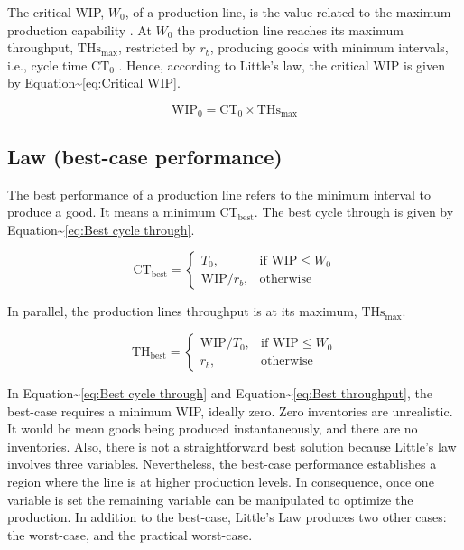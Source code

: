\documentclass{article}
\begin{document}
The critical WIP, \(W_0\), of a production line, is the value related to the maximum production capability \citep[p.219]{Hopp2001}.
At \(W_0\) the production line reaches its maximum throughput, \(\mbox{THs}_{\mbox{max}}\), restricted by \(r_b\), producing goods with minimum intervals, i.e., cycle time \(\mbox{CT}_0\) \citep{Martin1998}.
Hence, according to Little's law, the critical WIP is given by Equation\textasciitilde{}\ref{eq:Critical WIP}.

\begin{equation}\label{eq:Critical WIP}
  \mbox{WIP}_0 = \mbox{CT}_0 \times \mbox{THs}_{\mbox{max}}
\end{equation}

\subsection{Law (best-case performance)}

The best performance of a production line refers to the minimum interval to produce a good.
It means a minimum \(\mbox{CT}_{\mbox{best}}\).
The best cycle through is given by Equation\textasciitilde{}\ref{eq:Best cycle through}.

\begin{equation}\label{eq:Best cycle through}
    \mbox{CT}_{\mbox{best}}=
    \begin{cases}
 T_0,  & \mbox{if }\mbox{WIP} \le W_0\\
  \mbox{WIP}/r_b, & \mbox{otherwise }
    \end{cases}
\end{equation}

In parallel, the production lines throughput is at its maximum, \(\mbox{THs}_{\mbox{max}}\).

\begin{equation}\label{eq:Best throughput}
    \mbox{TH}_{\mbox{best}}=
    \begin{cases}
 \mbox{WIP}/T_0,  & \mbox{if }\mbox{WIP} \le W_0\\
  r_b, & \mbox{otherwise }
    \end{cases}
\end{equation}

In Equation\textasciitilde{}\ref{eq:Best cycle through} and Equation\textasciitilde{}\ref{eq:Best throughput}, the best-case requires a minimum WIP, ideally zero.
Zero inventories are unrealistic.
It would be mean goods being produced instantaneously, and there are no inventories.
Also, there is not a straightforward best solution because Little's law involves three variables.
Nevertheless, the best-case performance establishes a region where the line is at higher production levels.
In consequence, once one variable is set the remaining variable can be manipulated to optimize the production.
In addition to the best-case, Little's Law produces two other cases: the worst-case, and the practical worst-case.
\end{document}
